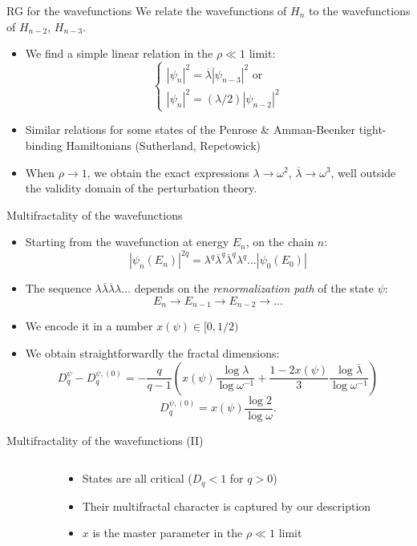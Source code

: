 \documentclass[xcolor=x11names,compress,professionalfonts]{beamer}
\renewcommand{\(}{\begin{columns}}
\renewcommand{\)}{\end{columns}}
\newcommand{\<}[1]{\begin{column}{#1}}
\renewcommand{\>}{\end{column}}
\newcommand{\lb}{\ensuremath{\overline{\lambda}}}
\begin{document}
\begin{frame}{RG for the wavefunctions}
We relate the wavefunctions of $H_n$ to the wavefunctions of $H_{n-2}$, $H_{n-3}$.
\begin{itemize}
	\item We find a simple linear relation in the $\rho \ll 1$ limit: 
	\[
	\begin{cases}
		|\psi_n|^2 = \lb |\psi_{n-3}|^2 \text{~or}\\
		|\psi_n|^2 = (\lambda/2) |\psi_{n-2}|^2
	\end{cases}
	\]
	\item Similar relations for some states of the Penrose \& Amman-Beenker tight-binding Hamiltonians (Sutherland, Repetowick)
	\item When $\rho \rightarrow 1$, we obtain the exact expressions $\lambda \rightarrow \omega^2$, $\lb \rightarrow \omega^3$, well outside the validity domain of the perturbation theory.
\end{itemize}
\end{frame}

\begin{frame}{Multifractality of the wavefunctions}
\begin{itemize}
	\item Starting from the wavefunction at energy $E_n$, on the chain $n$:
		\[ |\psi_n(E_n)|^{2q} = \lambda^q \lb^q \lb^q \lambda^q ... |\psi_0(E_0)| \]
	\item The sequence $\lambda \lb \lb \lambda ...$ depends on the \emph{renormalization path} of the state $\psi$:
	\[ E_n \rightarrow E_{n-1} \rightarrow E_{n-2} \rightarrow ... \]
	\item We encode it in a number $x(\psi) \in [0,1/2)$
	\item We obtain straightforwardly the fractal dimensions:
	\[ D_q^\psi - D_q^{\psi,(0)} = - \frac{q}{q-1} \left( x(\psi) \frac{\log \lambda}{\log \omega^{-1}} + \frac{1-2x(\psi)}{3}\frac{\log \lb}{\log \omega^{-1}} \right) \]
	\[  D_q^{\psi,(0)} = x(\psi) \frac{\log 2}{\log \omega}. \]
\end{itemize}
\end{frame}

\begin{frame}{Multifractality of the wavefunctions (II)}
\begin{columns}
	\begin{column}{5cm}
		\centering
	\end{column}
	\begin{column}{5cm}
		\begin{itemize}
			\item States are all critical ($D_{q} < 1$ for $q > 0$)
			\item Their multifractal character is captured by our description
			\item $x$ is the master parameter in the $\rho \ll 1$ limit
		\end{itemize}
	\end{column}
\end{columns}
\end{frame}
\end{document}
